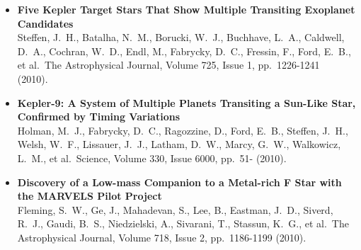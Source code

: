 \documentclass[12pt,letterpaper,sans]{moderncv} %
\begin{document}
\begin{itemize}
 \item \textbf{ Five Kepler Target Stars That Show Multiple Transiting 
Exoplanet Candidates } \\ Steffen, J.~H., Batalha, N.~M., Borucki, W.~J., 
Buchhave, L.~A., Caldwell, D.~A., Cochran, W.~D., Endl, M., Fabrycky, 
D.~C., Fressin, F., Ford, E.~B., et al.\ The Astrophysical Journal, Volume 
725, Issue 1, pp.~1226-1241 (2010).\ \\ 

 \item \textbf{ Kepler-9: A System of Multiple Planets Transiting a 
Sun-Like Star, Confirmed by Timing Variations } \\ Holman, M.~J., Fabrycky, 
D.~C., Ragozzine, D., Ford, E.~B., Steffen, J.~H., Welsh, W.~F., Lissauer, 
J.~J., Latham, D.~W., Marcy, G.~W., Walkowicz, L.~M., et al.\ Science, 
Volume 330, Issue 6000, pp.~51- (2010).\ \\ 

 \item \textbf{ Discovery of a Low-mass Companion to a Metal-rich F Star 
with the MARVELS Pilot Project } \\ Fleming, S.~W., Ge, J., Mahadevan, S., 
Lee, B., Eastman, J.~D., Siverd, R.~J., Gaudi, B.~S., Niedzielski, A., 
Sivarani, T., Stassun, K.~G., et al.\ The Astrophysical Journal, Volume 
718, Issue 2, pp.~1186-1199 (2010).\ \\ 


\end{itemize}

\newpage
\end{document}
